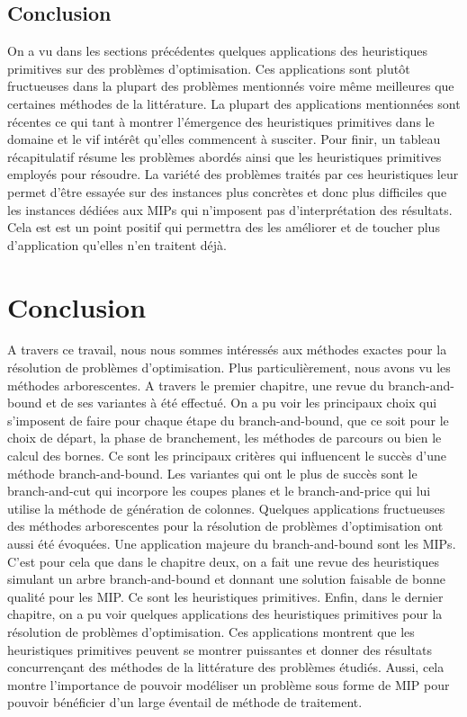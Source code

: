 \documentclass[12pt,a4paper,oneside]{book}
\theoremstyle{definition}
\begin{document}
    
	\section{Conclusion}
	On a vu dans les sections précédentes quelques applications des heuristiques primitives sur des problèmes d'optimisation. Ces applications sont plutôt fructueuses dans la plupart des problèmes mentionnés voire même meilleures que certaines méthodes de la littérature. La plupart des applications mentionnées sont récentes ce qui tant à montrer l'émergence des heuristiques primitives dans le domaine et le vif intérêt qu'elles commencent à susciter. Pour finir, un tableau récapitulatif résume les problèmes abordés ainsi que les heuristiques primitives employés pour résoudre. 
	La variété des problèmes traités par ces heuristiques leur permet d'être essayée sur des instances plus concrètes et donc plus difficiles que les instances dédiées aux MIPs qui n'imposent pas d'interprétation des résultats. Cela est est un point positif qui permettra des les améliorer et de toucher plus d'application qu'elles n'en traitent déjà.
	
	
	\chapter*{Conclusion}
	A travers ce travail, nous nous sommes intéressés aux méthodes exactes pour la résolution de problèmes d'optimisation. Plus particulièrement, nous avons vu les méthodes arborescentes. A travers le premier chapitre, une revue du branch-and-bound et de ses variantes à été effectué. On a pu voir les principaux choix qui s'imposent de faire pour chaque étape du branch-and-bound, que ce soit pour le choix de départ, la phase de branchement, les méthodes de parcours ou bien le calcul des bornes. Ce sont les principaux critères qui influencent le succès d'une méthode branch-and-bound. Les variantes qui ont le plus de succès sont le branch-and-cut qui incorpore les coupes planes et le branch-and-price qui lui utilise la méthode de génération de colonnes. Quelques applications fructueuses des méthodes arborescentes pour la résolution de problèmes d'optimisation ont aussi été évoquées. Une application majeure du branch-and-bound sont les MIPs. C'est pour cela que dans le chapitre deux, on a fait une revue des heuristiques simulant un arbre branch-and-bound et donnant une solution faisable de bonne qualité pour les MIP. Ce sont les heuristiques primitives. Enfin, dans le dernier chapitre, on a pu voir quelques applications des heuristiques primitives pour la résolution de problèmes d'optimisation. Ces applications montrent que les heuristiques primitives peuvent se montrer puissantes et donner des résultats concurrençant des méthodes de la littérature des problèmes étudiés. Aussi, cela montre l'importance de pouvoir modéliser un problème sous forme de MIP pour pouvoir bénéficier d'un large éventail de méthode de traitement. 
	
\end{document}
